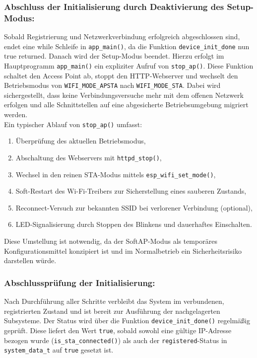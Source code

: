 \subsubsection{Abschluss der Initialisierung durch Deaktivierung des Setup-Modus:}  
Sobald Registrierung und Netzwerkverbindung erfolgreich abgeschlossen sind, endet eine while Schleife in \texttt{app\_main()}, da die Funktion \texttt{device\_init\_done} nun true returned. Danach wird der Setup-Modus beendet. Hierzu erfolgt im Hauptprogramm \texttt{app\_main()} ein expliziter Aufruf von \texttt{stop\_ap()}. Diese Funktion schaltet den Access Point ab, stoppt den HTTP-Webserver und wechselt den Betriebsmodus von \texttt{WIFI\_MODE\_APSTA} nach \texttt{WIFI\_MODE\_STA}. Dabei wird sichergestellt, dass keine Verbindungsversuche mehr mit dem offenen Netzwerk erfolgen und alle Schnittstellen auf eine abgesicherte Betriebsumgebung migriert werden.
\\
Ein typischer Ablauf von \texttt{stop\_ap()} umfasst:
\begin{enumerate}
	\item Überprüfung des aktuellen Betriebsmodus,
	\item Abschaltung des Webservers mit \texttt{httpd\_stop()},
	\item Wechsel in den reinen STA-Modus mittels \texttt{esp\_wifi\_set\_mode()},
	\item Soft-Restart des Wi-Fi-Treibers zur Sicherstellung eines sauberen Zustands,
	\item Reconnect-Versuch zur bekannten SSID bei verlorener Verbindung (optional),
	\item LED-Signalisierung durch Stoppen des Blinkens und dauerhaftes Einschalten.
\end{enumerate}

\noindent Diese Umstellung ist notwendig, da der SoftAP-Modus als temporäres Konfigurationsmittel konzipiert ist und im Normalbetrieb ein Sicherheitsrisiko darstellen würde.

\subsubsection{Abschlussprüfung der Initialisierung:}  
Nach Durchführung aller Schritte verbleibt das System im verbundenen, registrierten Zustand und ist bereit zur Ausführung der nachgelagerten Subsysteme. Der Status wird über die Funktion \texttt{device\_init\_done()} regelmäßig geprüft. Diese liefert den Wert \texttt{true}, sobald sowohl eine gültige IP-Adresse bezogen wurde (\texttt{is\_sta\_connected()}) als auch der \texttt{registered}-Status in \texttt{system\_data\_t} auf \texttt{true} gesetzt ist.

